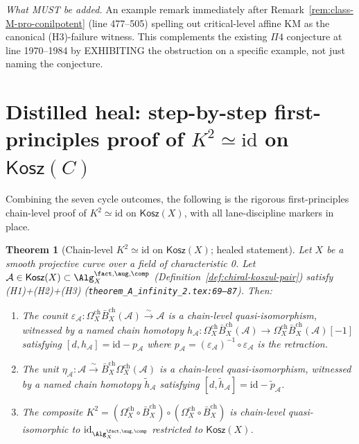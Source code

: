 \documentclass[11pt]{article}
\newtheorem{theorem}{Theorem}
\theoremstyle{definition}
\newcommand{\Bbarch}{\bar B^{\mathrm{ch}}}
\newcommand{\Omegach}{\Omega^{\mathrm{ch}}}
\newcommand{\Kosz}{\mathsf{Kosz}}
\newcommand{\id}{\mathrm{id}}
\newcommand{\cA}{\mathcal{A}}
\newcommand{\simequiv}{\xrightarrow{\sim}}
\begin{document}
\emph{What MUST be added.} An example remark immediately after
Remark~\ref{rem:class-M-pro-conilpotent} (line 477--505) spelling
out critical-level affine KM as the canonical (H3)-failure witness.
This complements the existing $\Pi 4$ conjecture at line 1970--1984
by EXHIBITING the obstruction on a specific example, not just
naming the conjecture.

\section*{Distilled heal: step-by-step first-principles proof of $K^{2}\simeq\id$ on $\Kosz(C)$}

Combining the seven cycle outcomes, the following is the rigorous
first-principles chain-level proof of $K^{2}\simeq\id$ on
$\Kosz(X)$, with all lane-discipline markers in place.

\begin{theorem}[Chain-level $K^{2}\simeq\id$ on $\Kosz(X)$;
healed statement]
\label{thm:healed-k-squared-id}
Let $X$ be a smooth projective curve over a field of characteristic 0.
Let $\cA\in\Kosz(X)\subset\Alg_X^{\fact,\aug,\comp}$
(Definition~\ref{def:chiral-koszul-pair}) satisfy (H1)+(H2)+(H3)
(\texttt{theorem\_A\_infinity\_2.tex:69--87}). Then:
\begin{enumerate}[label=\textup{(\roman*)}]
\item The counit $\varepsilon_\cA\colon\Omegach_X\Bbarch_X(\cA)
\simequiv\cA$ is a chain-level quasi-isomorphism, witnessed by a
named chain homotopy
$h_\cA\colon\Omegach_X\Bbarch_X(\cA)\to\Omegach_X\Bbarch_X(\cA)[-1]$
satisfying $[d,h_\cA]=\id-p_\cA$ where
$p_\cA=(\varepsilon_\cA)^{-1}\circ\varepsilon_\cA$ is the retraction.
\item The unit $\eta_\cA\colon\cA\simequiv\Bbarch_X\Omegach_X(\cA)$
is a chain-level quasi-isomorphism, witnessed by a named chain
homotopy $\tilde h_\cA$ satisfying $[d,\tilde h_\cA]=\id-\tilde p_\cA$.
\item The composite $K^{2}=(\Omegach_X\circ\Bbarch_X)\circ(\Omegach_X\circ\Bbarch_X)$
is chain-level quasi-isomorphic to $\id_{\Alg_X^{\fact,\aug,\comp}}$
restricted to $\Kosz(X)$.
\end{enumerate}
\end{theorem}
\end{document}
